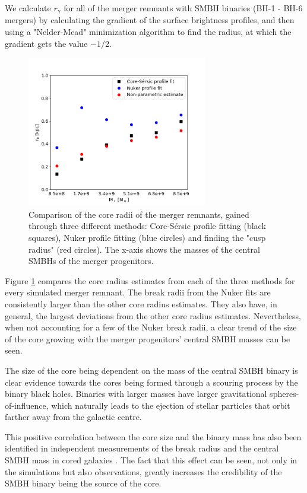 \documentclass[english, oneside]{HYgradu}
\begin{document}
We calculate $r_\gamma$ for all of the merger remnants with SMBH binaries (BH-1 - BH-6 mergers) by calculating the gradient of the surface brightness profiles, and then using a "Nelder-Mead" minimization algorithm to find the radius, at which the gradient gets the value $-1/2$. 

\begin{figure}[h]
	\centering
	\includegraphics[width=0.7\textwidth]{rb_mass_relation.png}
	\caption{Comparison of the core radii of the merger remnants, gained through three different methods: Core-Sérsic profile fitting (black squares), Nuker profile fitting (blue circles) and  finding the "cusp radius" (red circles). The x-axis shows the masses of the central SMBHs of the merger progenitors.}
	\label{figure:radii_comparison}
\end{figure}

Figure \ref{figure:radii_comparison} compares the core radius estimates from each of the three methods for every simulated merger remnant. The break radii from the Nuker fits are consistently larger than the other core radius estimates. They also have, in general, the largest deviations from the other core radius estimates. Nevertheless, when not accounting for a few of the Nuker break radii, a clear trend of the size of the core growing with the merger progenitors' central SMBH masses can be seen.

The size of the core being dependent on the mass of the central SMBH binary is clear evidence towards the cores being formed through a scouring process by the binary black holes. Binaries with larger masses have larger gravitational spheres-of-influence, which naturally leads to the ejection of stellar particles that orbit farther away from the galactic centre. 

This positive correlation between the core size and the binary mass has also been identified in independent measurements of the break radius and the central SMBH mass in cored galaxies \citep[e.g.][]{deRuiter2005, Lauer2007Cusp, Thomas2016}. The fact that this effect can be seen, not only in the simulations but also observations, greatly increases the credibility of the SMBH binary being the source of the core.
\end{document}
